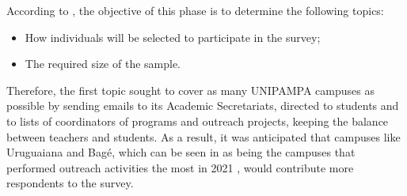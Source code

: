 
According to \textcite{kasunic2005designing}, the objective of this phase is to determine the following topics:
\begin{itemize}
    \item How individuals will be selected to participate in the survey;
    \item The required size of the sample.
\end{itemize}


Therefore, the first topic sought to cover as many \ac{UNIPAMPA} campuses as possible by sending emails to its Academic Secretariats, directed to students and to lists of coordinators of programs and outreach projects, keeping the balance between teachers and students.
As a result, it was anticipated that campuses like Uruguaiana and Bagé, which can be seen in  as being the campuses that performed outreach activities the most in 2021 \cite{relatorio-2021}, would contribute more respondents to the survey.

